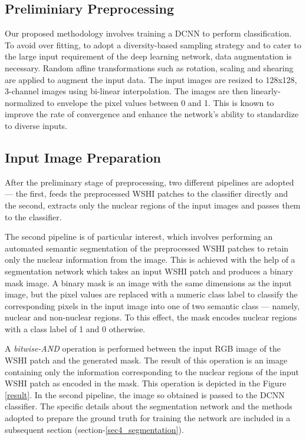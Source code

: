\documentclass{comjnl}
\begin{document}
\subsection{Preliminiary Preprocessing}
\label{sect_datapreprocess}
Our proposed methodology involves training a DCNN to perform classification. To avoid over fitting, to adopt a diversity-based sampling strategy and to cater to the large input requirement of the deep learning network, data augmentation is necessary. Random affine transformations such as rotation, scaling and shearing are applied to augment the input data. The input images are resized to 128x128, 3-channel images using bi-linear interpolation. The images are then linearly-normalized to envelope the pixel values between 0 and 1. This is known to improve the rate of convergence and enhance the network's ability to standardize to diverse inputs.

\subsection{Input Image Preparation}

After the preliminary stage of preprocessing, two different pipelines are adopted --- the first, feeds the preprocessed WSHI patches to the classifier directly and the second, extracts only the nuclear regions of the input images and passes them to the classifier.

The second pipeline is of particular interest, which involves performing an automated semantic segmentation of the preprocessed WSHI patches to retain only the nuclear information from the image. This is achieved with the help of a segmentation network which takes an input WSHI patch and produces a binary mask image. A binary mask is an image with the same dimensions as the input image, but the pixel values are replaced with a numeric class label to classify the corresponding pixels in the input image into one of two semantic class --- namely, nuclear and non-nuclear regions. To this effect, the mask encodes nuclear regions with a class label of 1 and 0 otherwise. 

A \emph{bitwise-AND} operation is performed between the input RGB image of the WSHI patch and the generated mask. The result of this operation is an image containing only the information corresponding to the nuclear regions of the input WSHI patch as encoded in the mask. This operation is depicted in the Figure \ref{result}. In the second pipeline, the image so obtained is passed to the DCNN classifier. The specific details about the segmentation network and the methods adopted to prepare the ground truth for training the network are included in a subsequent section (section-\ref{sec4_segmentation}).
\end{document}
